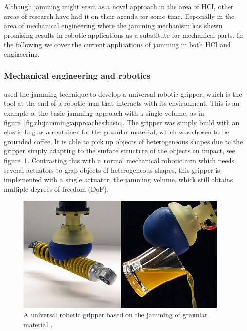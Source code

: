 Although jamming might seem as a novel approach in the area of HCI, other areas of research have had it on their agenda for some time. 
Especially in the area of mechanical engineering where the jamming mechanism has shown promising results in robotic applications as a substitute for mechanical parts.
In the following we cover the current applications of jamming in both HCI and engineering. 

\subsubsection{Mechanical engineering and robotics}

\citet{brown2010universal, amend2012positive} used the jamming technique to develop a universal robotic gripper, which is the tool at the end of a robotic arm that interacts with its environment.
This is an example of the basic jamming approach with a single volume, as in figure~\ref{fig:ch:jamming:approaches:basic}.
The gripper was simply build with an elastic bag as a container for the granular material, which was chosen to be grounded coffee. 
It is able to pick up objects of heterogeneous shapes due to the gripper simply adapting to the surface structure of the objects on impact, see figure~\ref{fig:ch:jamming:jamming-robot-gripper}. 
Contrasting this with a normal mechanical robotic arm which needs several actuators to grap objects of heterogeneous shapes, this gripper is implemented with a single actuator, the jamming volume, which still obtains multiple degrees of freedom (DoF).

\begin{figure}[h]
  \centering
  \includegraphics[width=0.9\linewidth]{figures/jamming/jamming-robot-gripper}
	\caption[A universal robotic gripper based on the jamming of granular material by \citet{brown2010universal}.]
   {A universal robotic gripper based on the jamming of granular material \citep{brown2010universal}.}
   \label{fig:ch:jamming:jamming-robot-gripper}
\end{figure}

